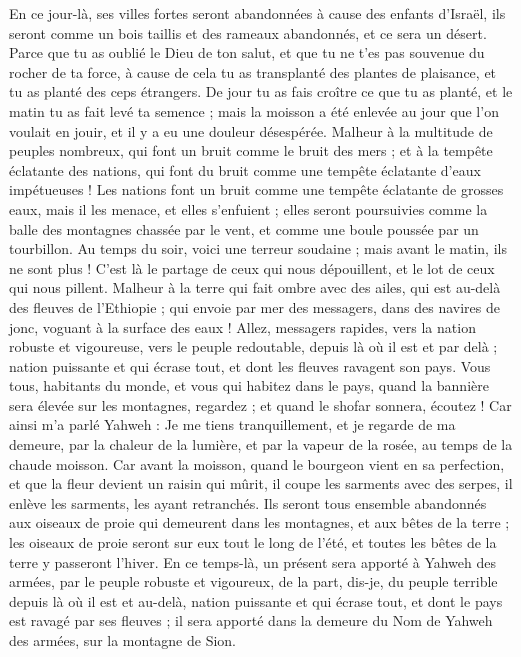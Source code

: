 \begin{multicols}{2}
En ce jour-là, ses villes fortes seront abandonnées à cause des enfants d'Israël, ils seront comme un bois taillis et des rameaux abandonnés, et ce sera un désert.
Parce que tu as oublié le Dieu de ton salut, et que tu ne t'es pas souvenue du rocher de ta force, à cause de cela tu as transplanté des plantes de plaisance, et tu as planté des ceps étrangers.
De jour tu as fais croître ce que tu as planté, et le matin tu as fait levé ta semence ; mais la moisson a été enlevée au jour que l'on voulait en jouir, et il y a eu une douleur désespérée.
Malheur à la multitude de peuples nombreux, qui font un bruit comme le bruit des mers ; et à la tempête éclatante des nations, qui font du bruit comme une tempête éclatante d'eaux impétueuses !
Les nations font un bruit comme une tempête éclatante de grosses eaux, mais il les menace, et elles s'enfuient ; elles seront poursuivies comme la balle des montagnes chassée par le vent, et comme une boule poussée par un tourbillon.
Au temps du soir, voici une terreur soudaine ; mais avant le matin, ils ne sont plus ! C'est là le partage de ceux qui nous dépouillent, et le lot de ceux qui nous pillent.
\VerseOne{}Malheur à la terre qui fait ombre avec des ailes, qui est au-delà des fleuves de l'Ethiopie ;
qui envoie par mer des messagers, dans des navires de jonc, voguant à la surface des eaux ! Allez, messagers rapides, vers la nation robuste et vigoureuse, vers le peuple redoutable, depuis là où il est et par delà ; nation puissante et qui écrase tout, et dont les fleuves ravagent son pays.
Vous tous, habitants du monde, et vous qui habitez dans le pays, quand la bannière sera élevée sur les montagnes, regardez ; et quand le shofar sonnera, écoutez !
Car ainsi m'a parlé Yahweh : Je me tiens tranquillement, et je regarde de ma demeure, par la chaleur de la lumière, et par la vapeur de la rosée, au temps de la chaude moisson.
Car avant la moisson, quand le bourgeon vient en sa perfection, et que la fleur devient un raisin qui mûrit, il coupe les sarments avec des serpes, il enlève les sarments, les ayant retranchés.
Ils seront tous ensemble abandonnés aux oiseaux de proie qui demeurent dans les montagnes, et aux bêtes de la terre ; les oiseaux de proie seront sur eux tout le long de l'été, et toutes les bêtes de la terre y passeront l'hiver.
En ce temps-là, un présent sera apporté à Yahweh des armées, par le peuple robuste et vigoureux, de la part, dis-je, du peuple terrible depuis là où il est et au-delà, nation puissante et qui écrase tout, et dont le pays est ravagé par ses fleuves ; il sera apporté dans la demeure du Nom de Yahweh des armées, sur la montagne de Sion.

\end{multicols}
